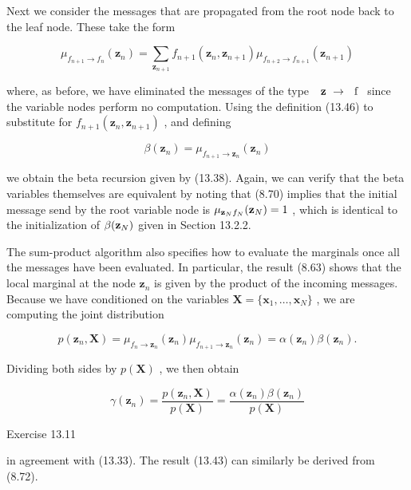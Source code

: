 \documentclass[
  10
]{article}
\begin{document}
Next we consider the messages that are propagated from the root node
back to the leaf node. These take the form

\[
\mu_ {f _ {n + 1} \rightarrow f _ {n}} (\mathbf {z} _ {n}) = \sum_ {\mathbf {z} _ {n + 1}} f _ {n + 1} (\mathbf {z} _ {n}, \mathbf {z} _ {n + 1}) \mu_ {f _ {n + 2} \rightarrow f _ {n + 1}} (\mathbf {z} _ {n + 1})\tag{13.51}
\]

where, as before, we have eliminated the messages of the type
\(\mathrm { ~ \bf ~ z ~ } \to \mathrm { ~ \boldsymbol ~ f ~ }\) since
the variable nodes perform no computation. Using the definition (13.46)
to substitute for
\(f _ { n + 1 } ( \mathbf { z } _ { n } , \mathbf { z } _ { n + 1 } )\)
, and defining

\[
\beta (\mathbf {z} _ {n}) = \mu_ {f _ {n + 1} \rightarrow \mathbf {z} _ {n}} (\mathbf {z} _ {n})\tag{13.52}
\]

we obtain the beta recursion given by (13.38). Again, we can verify that
the beta variables themselves are equivalent by noting that (8.70)
implies that the initial message send by the root variable node is
\(\mu _ { { \bf z } _ { N }  f _ { N } } ( { \bf z } _ { N } ) = 1\) ,
which is identical to the initialization of
\(\beta ( { \bf z } _ { N } )\) given in Section 13.2.2.

The sum-product algorithm also specifies how to evaluate the marginals
once all the messages have been evaluated. In particular, the result
(8.63) shows that the local marginal at the node
\(\mathbf { z } _ { n }\) is given by the product of the incoming
messages. Because we have conditioned on the variables
\(\mathbf { X } = \{ \mathbf { x } _ { 1 } , \ldots , \mathbf { x } _ { N } \}\)
, we are computing the joint distribution

\[
p (\mathbf {z} _ {n}, \mathbf {X}) = \mu_ {f _ {n} \to \mathbf {z} _ {n}} (\mathbf {z} _ {n}) \mu_ {f _ {n + 1} \to \mathbf {z} _ {n}} (\mathbf {z} _ {n}) = \alpha (\mathbf {z} _ {n}) \beta (\mathbf {z} _ {n}).\tag{13.53}
\]

Dividing both sides by \(p ( \mathbf { X } )\) , we then obtain

\[
\gamma (\mathbf {z} _ {n}) = \frac {p (\mathbf {z} _ {n} , \mathbf {X})}{p (\mathbf {X})} = \frac {\alpha (\mathbf {z} _ {n}) \beta (\mathbf {z} _ {n})}{p (\mathbf {X})}\tag{13.54}
\]

Exercise 13.11

in agreement with (13.33). The result (13.43) can similarly be derived
from (8.72).
\end{document}
